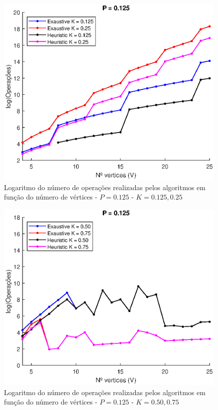 \documentclass{revdetua}
\begin{document}
\begin{figure}[h!]
\includegraphics[scale = 0.5]{Figs/3_P0125.eps}
\caption{Logaritmo do número de operações realizadas pelos algoritmos em função do número de vértices - $P = 0.125$ - $K = 0.125, 0.25$}
\label{3_P0125}
\end{figure}

\begin{figure}[h!]
\centering
\includegraphics[scale = 0.5]{Figs/4_P0125.eps}
\caption{Logaritmo do número de operações realizadas pelos algoritmos em função do número de vértices - $P = 0.125$ - $K = 0.50, 0.75$}
\label{4_P0125}
\end{figure}
\end{document}

